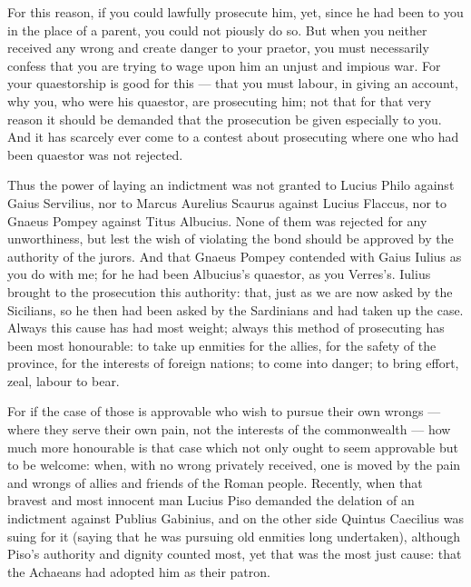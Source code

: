  For this reason, if you could lawfully prosecute him, yet, since he had been to you in the place of a parent, you could not piously do so. But when you neither received any wrong and create danger to your praetor, you must necessarily confess that you are trying to wage upon him an unjust and impious war. For your quaestorship is good for this --- that you must labour, in giving an account, why you, who were his quaestor, are prosecuting him; not that for that very reason it should be demanded that the prosecution be given especially to you. And it has scarcely ever come to a contest about prosecuting where one who had been quaestor was not rejected.

 Thus the power of laying an indictment was not granted to Lucius Philo against Gaius Servilius, nor to Marcus Aurelius Scaurus against Lucius Flaccus, nor to Gnaeus Pompey against Titus Albucius. None of them was rejected for any unworthiness, but lest the wish of violating the bond should be approved by the authority of the jurors. And that Gnaeus Pompey contended with Gaius Iulius as you do with me; for he had been Albucius's quaestor, as you Verres's. Iulius brought to the prosecution this authority: that, just as we are now asked by the Sicilians, so he then had been asked by the Sardinians and had taken up the case. Always this cause has had most weight; always this method of prosecuting has been most honourable: to take up enmities for the allies, for the safety of the province, for the interests of foreign nations; to come into danger; to bring effort, zeal, labour to bear.

 For if the case of those is approvable who wish to pursue their own wrongs --- where they serve their own pain, not the interests of the commonwealth --- how much more honourable is that case which not only ought to seem approvable but to be welcome: when, with no wrong privately received, one is moved by the pain and wrongs of allies and friends of the Roman people. Recently, when that bravest and most innocent man Lucius Piso demanded the delation of an indictment against Publius Gabinius, and on the other side Quintus Caecilius was suing for it (saying that he was pursuing old enmities long undertaken), although Piso's authority and dignity counted most, yet that was the most just cause: that the Achaeans had adopted him as their patron.

